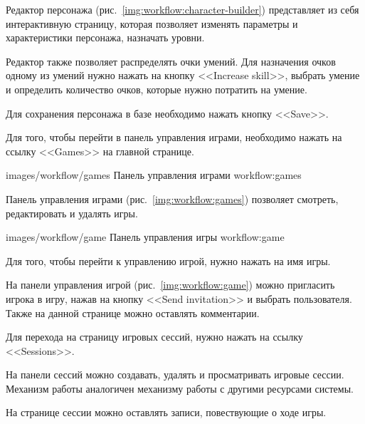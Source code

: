Редактор персонажа (рис.~\ref{img:workflow:character-builder}) представляет из себя интерактивную страницу, которая позволяет изменять параметры и характеристики персонажа, назначать уровни.

Редактор также позволяет распределять очки умений. Для назначения очков одному из умений нужно нажать на кнопку <<Increase skill>>, выбрать умение и определить количество очков, которые нужно потратить на умение.

Для сохранения персонажа в базе необходимо нажать кнопку <<Save>>.

Для того, чтобы перейти в панель управления играми, необходимо нажать на ссылку <<Games>> на главной странице.

            {images/workflow/games}
            {Панель управления играми}
            {workflow:games}

Панель управления играми (рис.~\ref{img:workflow:games}) позволяет смотреть, редактировать и удалять игры.

            {images/workflow/game}
            {Панель управления игры}
            {workflow:game}

Для того, чтобы перейти к управлению игрой, нужно нажать на имя игры.

На панели управления игрой (рис.~\ref{img:workflow:game}) можно пригласить игрока в игру, нажав на кнопку <<Send invitation>> и выбрать пользователя. Также на данной странице можно оставлять комментарии.


Для перехода на страницу игровых сессий, нужно нажать на ссылку <<Sessions>>.

На панели сессий можно создавать, удалять и просматривать игровые сессии. Механизм работы аналогичен механизму работы с другими ресурсами системы.

На странице сессии можно оставлять записи, повествующие о ходе игры.
